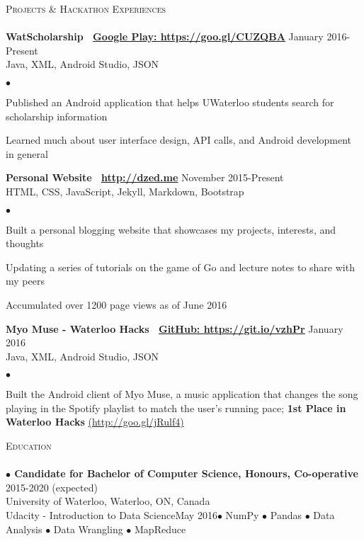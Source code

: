 \documentclass{article}
\newcommand{\lineunder}{\vspace*{-8pt} \\ \hspace*{-18pt} \hrulefill \\}
\newcommand{\header}[1]{{\hspace*{-15pt}\vspace*{6pt} \textsc{#1}} \vspace*{-6pt} \lineunder}
\newcommand{\employer}[3]{{ \textbf{#1} \hfill #2\\ {#3}\\  }}
\newenvironment{achievements}{\begin{list}{$\bullet$}{\topsep 0pt \itemsep -2pt}}{\vspace*{4pt}\end{list}}
\newcommand{\schoolwithcourses}[4]{
 \hspace{12pt} \textbf{$\bullet$ \hspace{2bp}#1} \hfill{#2}\\ \hspace{25pt}#3\\ 
\vspace*{5pt}
}
\begin{document}
\header{Projects \& Hackathon Experiences}

\employer{WatScholarship \hspace{5pt} \Mundus~\href{https://goo.gl/CUZQBA}{Google Play: \underline{https://goo.gl/CUZQBA}}}{January 2016-Present}{Java, XML, Android Studio, JSON}
	\begin{achievements}
	\item Published an Android application that helps UWaterloo students search for scholarship information
	\item Learned much about user interface design, API calls, and Android development in general
	\end{achievements}
	
\employer{Personal Website \hspace{5pt} \Mundus~\href{http://dzed.me}{\underline{http://dzed.me}}}{November 2015-Present}{HTML, CSS, JavaScript, Jekyll, Markdown, Bootstrap}
	\begin{achievements}
	\item Built a personal blogging website that showcases my projects, interests, and thoughts
	\item Updating a series of tutorials on the game of Go and lecture notes to share with my peers
	\item Accumulated over 1200 page views as of June 2016
	\end{achievements}

\employer{Myo Muse - Waterloo Hacks \hspace{5pt} \Mundus~\href{https://git.io/vzhPr}{GitHub: \underline{https://git.io/vzhPr}}}{January 2016}{Java, XML, Android Studio, JSON}
	\begin{achievements}
	\item Built the Android client of Myo Muse, a music application that changes the song playing in the Spotify playlist to match the user's running pace; \textbf{1st Place in Waterloo Hacks} \href{http://goo.gl/jRulf4}{(\underline{http://goo.gl/jRulf4})}
	\end{achievements}

\header{Education}

\schoolwithcourses{Candidate for Bachelor of Computer Science, Honours, Co-operative}{2015-2020 (expected)}{University of Waterloo, Waterloo, ON, Canada}

\schoolwithcourses{Udacity - Introduction to Data Science}{May 2016}{$\bullet$ NumPy $\bullet$ Pandas $\bullet$ Data Analysis $\bullet$ Data Wrangling $\bullet$ MapReduce}
\end{document}
